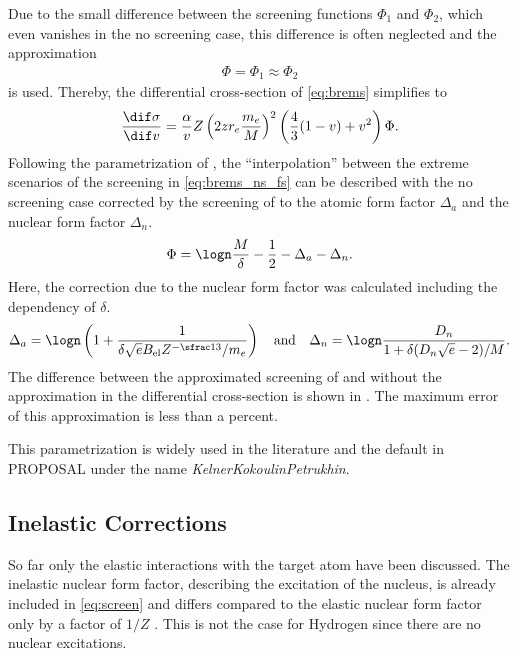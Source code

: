 Due to the small difference between the screening functions $\Phi_1$ and $\Phi_2$, which even vanishes in the no screening case, this difference is often neglected and the approximation
\begin{align} \label{eq:screen_approx}
    \Phi = \Phi_1 \approx \Phi_2
\end{align}
is used.
Thereby, the differential cross-section of \eqref{eq:brems} simplifies to
\begin{align} \label{eq:brems_approx}
\frac{\dif \sigma}{\dif v} =
    \frac{\alpha}{v} Z \left(2z r_e \frac{m_e}{M}\right)^2
    \left( \frac{4}{3}(1 - v) + v^2 \right) \Phi .
\end{align}
Following the parametrization of \cite{Kelner95Brems}, the \enquote{interpolation} between the extreme scenarios of the screening in \eqref{eq:brems_ns_fs} can be described with the no screening case corrected by the screening of to the atomic form factor $\Delta_a$ and the nuclear form factor $\Delta_n$.
\begin{align}
    \Phi = \logn \frac{M}{\delta} - \frac12 - \Delta_a - \Delta_n .
\end{align}
Here, the correction due to the nuclear form factor was calculated including the dependency of $\delta$.
\begin{align}
	\Delta_a = \logn \left( 1 + \frac{1}{\delta \sqrt{e} B_{\text{el}} Z^{-\sfrac13} / m_e} \right)
    \quad
    \text{and}
    \quad
    \Delta_n = \logn \frac{D_n}{1 + \delta (D_n \sqrt{e} - 2) / M} .
\end{align}
The difference between the approximated screening of \cite{Kelner95Brems} and without the approximation \cite{Sandrock18PhD} in the differential cross-section is shown in .
The maximum error of this approximation is less than a percent.

This parametrization is widely used in the literature and the default in PROPOSAL under the name \textit{KelnerKokoulinPetrukhin}.

\subsection{Inelastic Corrections} \label{sec:brems_inel}

So far only the elastic interactions with the target atom have been discussed.
The inelastic nuclear form factor, describing the excitation of the nucleus, is already included in \eqref{eq:screen} and differs compared to the elastic nuclear form factor only by a factor of $1/Z$ \cite{Andreev94Brems}.
This is not the case for Hydrogen since there are no nuclear excitations.

